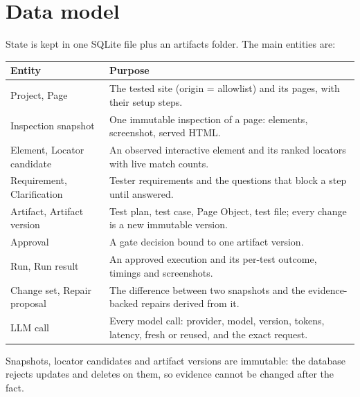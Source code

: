 \documentclass[11pt,a4paper]{article}
\begin{document}
\section{Data model}
\label{sec:data}
State is kept in one SQLite file plus an artifacts folder. The main entities are:

\begin{tabularx}{\linewidth}{@{}L{3.6cm}X@{}}
\toprule
\textbf{Entity} & \textbf{Purpose} \\
\midrule
Project, Page & The tested site (origin = allowlist) and its pages, with their setup steps. \\
Inspection snapshot & One immutable inspection of a page: elements, screenshot, served HTML. \\
Element, Locator candidate & An observed interactive element and its ranked locators with live match counts. \\
Requirement, Clarification & Tester requirements and the questions that block a step until answered. \\
Artifact, Artifact version & Test plan, test case, Page Object, test file; every change is a new immutable version. \\
Approval & A gate decision bound to one artifact version. \\
Run, Run result & An approved execution and its per-test outcome, timings and screenshots. \\
Change set, Repair proposal & The difference between two snapshots and the evidence-backed repairs derived from it. \\
LLM call & Every model call: provider, model, version, tokens, latency, fresh or reused, and the exact request. \\
\bottomrule
\end{tabularx}

\medskip
Snapshots, locator candidates and artifact versions are immutable: the database rejects updates and deletes on them, so evidence cannot be changed after the fact.

\end{document}
